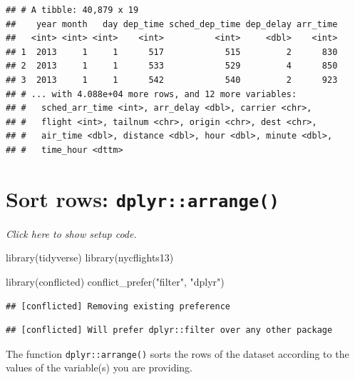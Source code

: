 \documentclass[]{book}
\newenvironment{Shaded}{}{}
\newcommand{\KeywordTok}[1]{\textcolor[rgb]{0.00,0.00,1.00}{#1}}
\newcommand{\NormalTok}[1]{#1}
\newcommand{\OperatorTok}[1]{#1}
\newcommand{\StringTok}[1]{\textcolor[rgb]{0.00,0.50,0.50}{#1}}
\begin{document}
\begin{verbatim}
## # A tibble: 40,879 x 19
##    year month   day dep_time sched_dep_time dep_delay arr_time
##   <int> <int> <int>    <int>          <int>     <dbl>    <int>
## 1  2013     1     1      517            515         2      830
## 2  2013     1     1      533            529         4      850
## 3  2013     1     1      542            540         2      923
## # ... with 4.088e+04 more rows, and 12 more variables:
## #   sched_arr_time <int>, arr_delay <dbl>, carrier <chr>,
## #   flight <int>, tailnum <chr>, origin <chr>, dest <chr>,
## #   air_time <dbl>, distance <dbl>, hour <dbl>, minute <dbl>,
## #   time_hour <dttm>
\end{verbatim}

\hypertarget{sort-rows-dplyrarrange}{%
\section{\texorpdfstring{Sort rows: \texttt{dplyr::arrange()}}{Sort rows: dplyr::arrange()}}\label{sort-rows-dplyrarrange}}

\emph{Click here to show setup code.}

\begin{Shaded}
\begin{Highlighting}[]
\KeywordTok{library}\NormalTok{(tidyverse)}
\KeywordTok{library}\NormalTok{(nycflights13)}

\KeywordTok{library}\NormalTok{(conflicted)}
\KeywordTok{conflict_prefer}\NormalTok{(}\StringTok{"filter"}\NormalTok{, }\StringTok{"dplyr"}\NormalTok{)}
\end{Highlighting}
\end{Shaded}

\begin{verbatim}
## [conflicted] Removing existing preference
\end{verbatim}

\begin{verbatim}
## [conflicted] Will prefer dplyr::filter over any other package
\end{verbatim}

The function \texttt{dplyr::arrange()} sorts the rows of the dataset according to the values of the variable(s) you are providing.

\begin{Shaded}
\end{Shaded}
\end{document}
